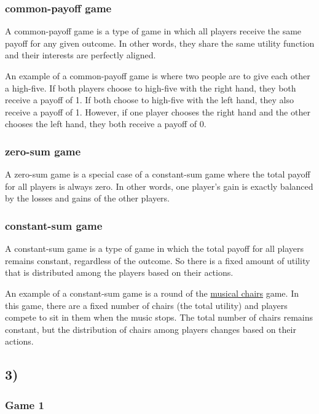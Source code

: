 \documentclass[10pt]{article}
\begin{document}
\subsubsection*{common-payoff game}

A common-payoff game is a type of game in which all players receive the same payoff for any given outcome. In other words, they share the same utility function and their interests are perfectly aligned.

An example of a common-payoff game is where two people are to give each other a high-five. If both players choose to high-five with the right hand, they both receive a payoff of 1. If both choose to high-five with the left hand, they also receive a payoff of 1. However, if one player chooses the right hand and the other chooses the left hand, they both receive a payoff of 0.

\subsubsection*{zero-sum game}

A zero-sum game is a special case of a constant-sum game where the total payoff for all players is always zero. In other words, one player's gain is exactly balanced by the losses and gains of the other players.

\subsubsection*{constant-sum game}

A constant-sum game is a type of game in which the total payoff for all players remains constant, regardless of the outcome. So there is a fixed amount of utility that is distributed among the players based on their actions.

An example of a constant-sum game is a round of the \href{https://en.wikipedia.org/wiki/Musical_chairs}{musical chairs} game. In this game, there are a fixed number of chairs (the total utility) and players compete to sit in them when the music stops. The total number of chairs remains constant, but the distribution of chairs among players changes based on their actions.

\subsection*{3)}

\subsubsection*{Game 1}
\end{document}

